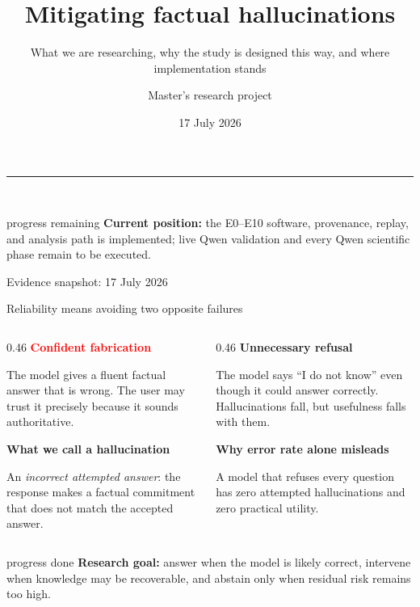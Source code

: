 \documentclass[aspectratio=169,11pt]{beamer}
\title{Mitigating factual hallucinations}
\subtitle{What we are researching, why the study is designed this way, and where implementation stands}
\author{Master's research project}
\date{17 July 2026}
\begin{document}
\begin{frame}[plain]
  \vspace{0.55cm}
  {\color{Blue}\rule{1.5cm}{3pt}}\\[0.45cm]
  {\inserttitle\par}
  \vspace{0.25cm}
  {\insertsubtitle\par}
  \vfill
  \begin{beamercolorbox}[rounded=true,sep=0.7em,wd=0.91\textwidth]{progress remaining}
    \textbf{Current position:} the E0--E10 software, provenance, replay, and analysis path is implemented; live Qwen validation and every Qwen scientific phase remain to be executed.
  \end{beamercolorbox}
  \vspace{0.4cm}
  {\small\color{Muted}Evidence snapshot: 17 July 2026}
\end{frame}

\begin{frame}{Reliability means avoiding two opposite failures}
  \footnotesize
  \begin{columns}[T,onlytextwidth]
    \begin{column}{0.46\textwidth}
      \textcolor{Red}{\bfseries Confident fabrication}\par\vspace{0.15cm}
      The model gives a fluent factual answer that is wrong. The user may trust it precisely because it sounds authoritative.\par\vspace{0.25cm}
      \textbf{What we call a hallucination}\par
      An \emph{incorrect attempted answer}: the response makes a factual commitment that does not match the accepted answer.
    \end{column}
    \begin{column}{0.46\textwidth}
      \textcolor{Amber}{\bfseries Unnecessary refusal}\par\vspace{0.15cm}
      The model says ``I do not know'' even though it could answer correctly. Hallucinations fall, but usefulness falls with them.\par\vspace{0.25cm}
      \textbf{Why error rate alone misleads}\par
      A model that refuses every question has zero attempted hallucinations and zero practical utility.
    \end{column}
  \end{columns}
  \vspace{0.2cm}
  \begin{beamercolorbox}[rounded=true,sep=0.3em]{progress done}
    \textbf{Research goal:} answer when the model is likely correct, intervene when knowledge may be recoverable, and abstain only when residual risk remains too high.
  \end{beamercolorbox}
\end{frame}
\end{document}
